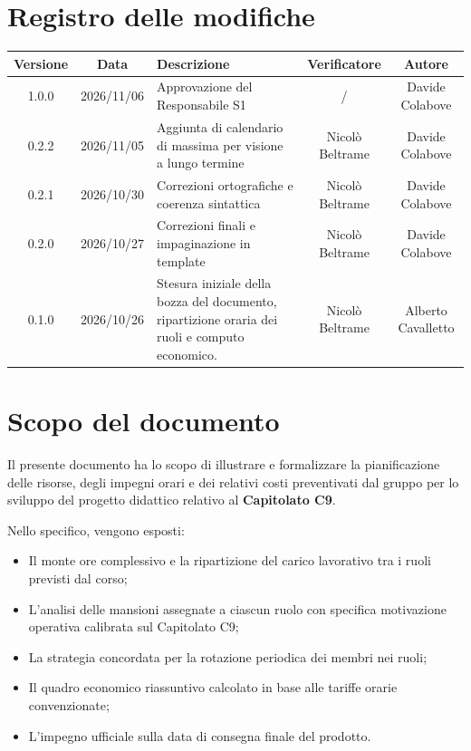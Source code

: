 \documentclass[a4paper, 11pt]{article}
\begin{document}
\section*{Registro delle modifiche}
\begin{tabularx}{\textwidth}{|c|c|X|c|c|}
    \hline
    \textbf{Versione} & \textbf{Data} & \textbf{Descrizione} & \textbf{Verificatore} & \textbf{Autore} \\ \hline
    1.0.0 & 2026/11/06 & Approvazione del Responsabile S1 & / & Davide Colabove \\ \hline
    0.2.2 & 2026/11/05 & Aggiunta di calendario di massima per visione a lungo termine & Nicolò Beltrame & Davide Colabove \\ \hline
    0.2.1 & 2026/10/30 & Correzioni ortografiche e coerenza sintattica & Nicolò Beltrame & Davide Colabove \\ \hline
    0.2.0 & 2026/10/27 & Correzioni finali e impaginazione in template & Nicolò Beltrame & Davide Colabove \\ \hline
    0.1.0 & 2026/10/26 & Stesura iniziale della bozza del documento, ripartizione oraria dei ruoli e computo economico. & Nicolò Beltrame & Alberto Cavalletto\\ \hline
\end{tabularx}

\newpage
\tableofcontents
\newpage

\section{Scopo del documento}
Il presente documento ha lo scopo di illustrare e formalizzare la pianificazione delle risorse, degli impegni orari e dei relativi costi preventivati dal gruppo per lo sviluppo del progetto didattico relativo al \textbf{Capitolato C9}.

Nello specifico, vengono esposti:
\begin{itemize}[label=-]
    \item Il monte ore complessivo e la ripartizione del carico lavorativo tra i ruoli previsti dal corso;
    \item L'analisi delle mansioni assegnate a ciascun ruolo con specifica motivazione operativa calibrata sul Capitolato C9;
    \item La strategia concordata per la rotazione periodica dei membri nei ruoli;
    \item Il quadro economico riassuntivo calcolato in base alle tariffe orarie convenzionate;
    \item L'impegno ufficiale sulla data di consegna finale del prodotto.
\end{itemize}
\end{document}
